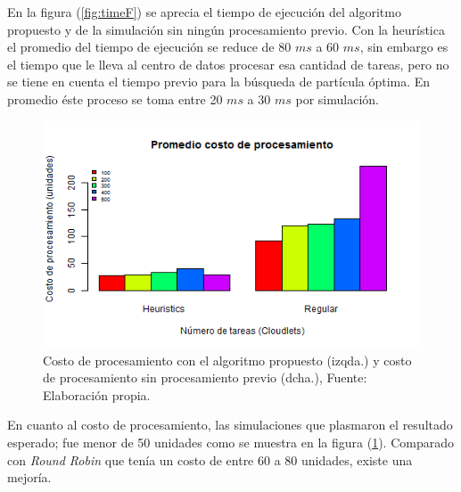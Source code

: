 En la figura (\ref{fig:timeF}) se aprecia el tiempo de ejecución del algoritmo propuesto y de la simulación sin ningún procesamiento previo. Con la heurística el promedio del tiempo de ejecución se reduce de 80 $ms$ a 60 $ms$, sin embargo es el tiempo que le lleva al centro de datos procesar esa cantidad de tareas, pero no se tiene en cuenta el tiempo previo para la búsqueda de partícula óptima. En promedio éste proceso se toma entre 20 $ms$ a 30 $ms$ por simulación.

\renewcommand\thefigure{\arabic{figure}}
\begin{figure}[h!] 
	\centering
	\includegraphics[scale=0.7]{media/costoFinal}
	\caption{Costo de procesamiento con el algoritmo propuesto (izqda.) y costo de procesamiento sin procesamiento previo (dcha.), Fuente: Elaboraci\'on propia.}
	\label{fig:costF}
\end{figure}

En cuanto al costo de procesamiento, las simulaciones que plasmaron el resultado esperado; fue menor de 50 unidades como se muestra en la figura (\ref{fig:costF}). Comparado con \textit{Round Robin} que tenía un costo de entre 60 a 80 unidades, existe una mejoría.

